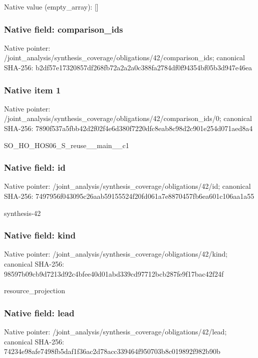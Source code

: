 \documentclass[10pt,a4paper]{article}
\begin{document}
Native value (empty\_\allowbreak{}array): []

\subsubsection{Native field: comparison\_\allowbreak{}ids}
Native pointer: /joint\_\allowbreak{}analysis/synthesis\_\allowbreak{}coverage/obligations/42/comparison\_\allowbreak{}ids; canonical SHA-256: b2df57e17320857df268fb72a2a2a0c388fa2784df0f94354bf05b3d947e46ea

\subsubsection{Native item 1}
Native pointer: /joint\_\allowbreak{}analysis/synthesis\_\allowbreak{}coverage/obligations/42/comparison\_\allowbreak{}ids/0; canonical SHA-256: 7890f537a5fbb42d2f02f4e6d380f7220dfc8eab8c98d2c901e254d071aed8a4

\begingroup\raggedright\sloppy SO\_\allowbreak{}HO\_\allowbreak{}HOS06\_\allowbreak{}S\_\allowbreak{}reuse\_\allowbreak{}\_\allowbreak{}main\_\allowbreak{}\_\allowbreak{}c1\par\endgroup

\subsubsection{Native field: id}
Native pointer: /joint\_\allowbreak{}analysis/synthesis\_\allowbreak{}coverage/obligations/42/id; canonical SHA-256: 7497956f043095c26aab59155524f20fd061a7e8870457fb6ea601c106aa1a55

\begingroup\raggedright\sloppy synthesis-42\par\endgroup

\subsubsection{Native field: kind}
Native pointer: /joint\_\allowbreak{}analysis/synthesis\_\allowbreak{}coverage/obligations/42/kind; canonical SHA-256: 98597b09cb9d7213d92c4bfee40d01abd339cd97712bcb287fe9f17bac42f24f

\begingroup\raggedright\sloppy resource\_\allowbreak{}projection\par\endgroup

\subsubsection{Native field: lead}
Native pointer: /joint\_\allowbreak{}analysis/synthesis\_\allowbreak{}coverage/obligations/42/lead; canonical SHA-256: 74234e98afe7498fb5daf1f36ac2d78acc339464f950703b8c019892f982b90b
\end{document}
